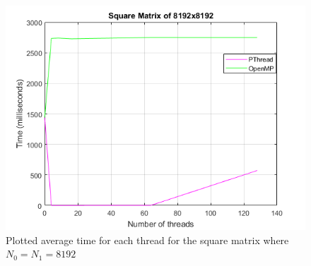 \documentclass[10pt, conference]{IEEEtran}
\begin{document}
\begin{appendices}
\begin{figure}[h!]
\renewcommand{\thefigure}{\arabic{figure}}
\centering
\includegraphics[scale=0.8]{Graph8192.png}
\caption{Plotted average time for each thread for the square matrix where $N_0 = N_1 = 8192$}
\label{Graph8192}
\end{figure}


\end{appendices}



\end{document}
